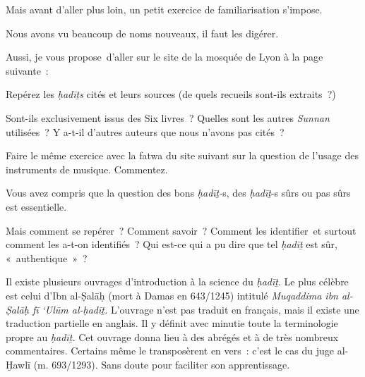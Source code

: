 Mais avant d'aller plus loin, un petit exercice de familiarisation
s'impose.

Nous avons vu beaucoup de noms nouveaux, il faut les digérer.

Aussi, je vous propose~d'aller sur le site de la mosquée de Lyon à la
page suivante~:


Repérez les \emph{ḥadīṯs} cités et leurs sources (de quels recueils
sont-ils extraits~?)

Sont-ils exclusivement issus des Six livres~? Quelles sont les autres
\emph{Sunnan} utilisées~? Y a-t-il d'autres auteurs que nous n'avons pas
cités~?

Faire le même exercice avec la fatwa du site suivant sur la question de
l'usage des instruments de musique. Commentez.
 \\



Vous avez compris que la question des bons \emph{ḥadīṯ-}s, des
\emph{ḥadīṯ}-s sûrs ou pas sûrs est essentielle.
\begin{Def}
Mais comment se
repérer~? Comment savoir~? Comment les identifier~et surtout comment les
a-t-on identifiés~? Qui est-ce qui a pu dire que tel \emph{ḥadīṯ} est
sûr, «~authentique~»~?
\end{Def}
 

Il existe plusieurs ouvrages d'introduction à la science du
\emph{ḥadīṯ}. Le plus célèbre est celui d'Ibn al-Ṣalāḥ \label{Ibnsalah1} (mort à Damas en
643/1245) intitulé \emph{Muqaddima ibn al-Ṣalāḥ fī `Ulūm al-ḥadīṯ.}
L'ouvrage n'est pas traduit en français, mais il existe une traduction
partielle en anglais. Il y définit
avec minutie toute la terminologie propre au \emph{ḥadīṯ.} Cet ouvrage
donna lieu à des abrégés et à de très nombreux commentaires. Certains
même le transposèrent en vers~: c'est le cas du juge al-Ḫawlī (m.
693/1293). Sans doute pour faciliter son apprentissage.


